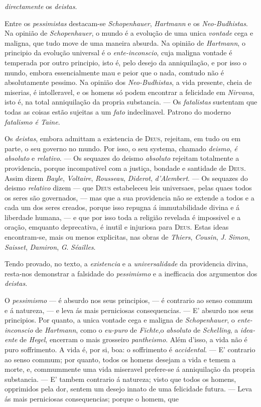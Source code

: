 \emph{directamente} os \emph{deistas}.\par Entre os \emph{pessimistas} destacam-se \emph{Schopenhauer}, \emph{Hartmann} e os \emph{Neo-Budhistas}. Na opinião de \emph{Schopenhauer}, o mundo é a evolução de uma unica \emph{vontade} cega e maligna, que tudo move de uma maneira absurda. Na opinião de \emph{Hartmann}, o principio da evolução universal é o \emph{ente-inconscio}, cuja maligna vontade é temperada por outro principio, isto é, pelo desejo da anniquilação, e por isso o mundo, embora essencialmente mau e peior que o nada, comtudo não é absolutamente pessimo. Na opinião dos \emph{Neo-Budhistas}, a vida presente, cheia de miserias, é intolleravel, e os homens só podem encontrar a felicidade em \emph{Nirvana}, isto é, na total anniquilação da propria substancia. --- Os \emph{fatalistas} sustentam que todas as coisas estão sujeitas a um \emph{fato} indeclinavel. Patrono do moderno \emph{fatalismo é Taine}.\par Os \emph{deistas}, embora admittam a existencia de \textsc{Deus}, rejeitam, em tudo ou em parte, o seu governo no mundo. Por isso, o seu systema, chamado \emph{deismo}, \emph{é absoluto} e \emph{relativo}. --- Os sequazes do deismo \emph{absoluto} rejeitam totalmente a providencia, porque incompativel com a justiça, bondade e santidade de \textsc{Deus}. Assim dizem \emph{Bayle}, \emph{Voltaire}, \emph{Rousseau}, \emph{Diderot}, \emph{d'Alembert}. --- Os sequazes do deismo \emph{relativo} dizem --- que \textsc{Deus} estabeleceu leis universaes, pelas quaes todos os seres são governados, --- mas que a sua providencia não se extende a todos e a cada um dos seres creados, porque isso repugna á immutabilidade divina e á liberdade humana, --- e que por isso toda a religião revelada é impossivel e a oração, emquanto deprecativa, é inutil e injuriosa para \textsc{Deus}. Estas ideas encontram-se, mais ou menos explicitas, nas obras de \emph{Thiers}, \emph{Cousin}, \emph{J}. \emph{Simon}, \emph{Saisset}, \emph{Damiron}, \emph{G}. \emph{Séailles}.\par Tendo provado, no texto, a \emph{existencia} e a \emph{universalidade} da providencia divina, resta-nos demonstrar a falsidade do \emph{pessimismo} e a inefficacia dos argumentos dos \emph{deistas}.\par O \emph{pessimismo} --- é absurdo nos seus principios, --- é contrario ao senso commum e á natureza, --- e leva ás mais perniciosas consequencias. --- E' absurdo nos seus principios. Por quanto, a unica vontade cega e maligna de \emph{Schopenhauer}, o \emph{ente-inconscio} de \emph{Hartmann}, como o \emph{eu-puro} de \emph{Fichte},o \emph{absoluto} de \emph{Schelling}, a \emph{idea-ente} de \emph{Hegel}, encerram o mais grosseiro \emph{pantheismo}. Além d'isso, a vida não é puro soffrimento. A vida é, por si, boa: o soffrimento é \emph{accidental}. --- E' contrario ao senso commum; por quanto, todos os homens desejam a vida e temem a morte, e, commummente uma vida miseravel prefere-se á anniquilação da propria substancia. --- E' tambem contrario á natureza; visto que todos os homens, opprimidos pela dor, sentem um desejo innato de uma felicidade futura. --- Leva ás mais perniciosas consequencias; porque o homem, que 